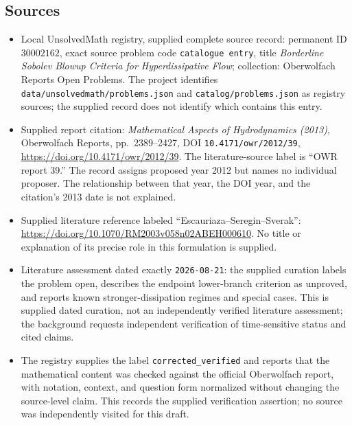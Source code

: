 \documentclass[11pt]{article}
\begin{document}
\subsection{Sources}
\begin{itemize}
\item Local UnsolvedMath registry, supplied complete source record: permanent ID \(30002162\), exact source problem code \texttt{catalogue entry}, title \emph{Borderline Sobolev Blowup Criteria for Hyperdissipative Flow}; collection: Oberwolfach Reports Open Problems. The project identifies \texttt{data/unsolvedmath/problems.json} and \texttt{catalog/problems.json} as registry sources; the supplied record does not identify which contains this entry.
\item Supplied report citation: \emph{Mathematical Aspects of Hydrodynamics (2013)}, Oberwolfach Reports, pp.\ 2389--2427, DOI \texttt{10.4171/owr/2012/39}, \url{https://doi.org/10.4171/owr/2012/39}. The literature-source label is ``OWR report 39.'' The record assigns proposed year 2012 but names no individual proposer. The relationship between that year, the DOI year, and the citation's 2013 date is not explained.
\item Supplied literature reference labeled ``Escauriaza--Seregin--Sverak'': \url{https://doi.org/10.1070/RM2003v058n02ABEH000610}. No title or explanation of its precise role in this formulation is supplied.
\item Literature assessment dated exactly \texttt{2026-08-21}: the supplied curation labels the problem open, describes the endpoint lower-branch criterion as unproved, and reports known stronger-dissipation regimes and special cases. This is supplied dated curation, not an independently verified literature assessment; the background requests independent verification of time-sensitive status and cited claims.
\item The registry supplies the label \texttt{corrected\_verified} and reports that the mathematical content was checked against the official Oberwolfach report, with notation, context, and question form normalized without changing the source-level claim. This records the supplied verification assertion; no source was independently visited for this draft.
\end{itemize}
\end{document}
